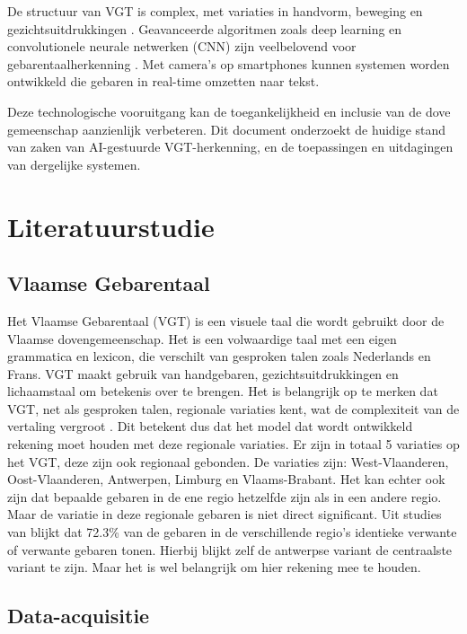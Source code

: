 De structuur van VGT is complex, met variaties in handvorm, beweging en gezichtsuitdrukkingen \autocite{469340}. Geavanceerde algoritmen zoals deep learning en convolutionele neurale netwerken (CNN) zijn veelbelovend voor gebarentaalherkenning \autocite{10.52756/ijerr.2023.v34spl.004}\autocite{10.17485/ijst/v16i45.2583}. Met camera's op smartphones kunnen systemen worden ontwikkeld die gebaren in real-time omzetten naar tekst.

Deze technologische vooruitgang kan de toegankelijkheid en inclusie van de dove gemeenschap aanzienlijk verbeteren. Dit document onderzoekt de huidige stand van zaken van AI-gestuurde VGT-herkenning, en de toepassingen en uitdagingen van dergelijke systemen.
\section{Literatuurstudie}%
\label{sec:literatuurstudie}

\subsection{Vlaamse Gebarentaal}
\label{subsec:vgt}

Het Vlaamse Gebarentaal (VGT) is een visuele taal die wordt gebruikt door de Vlaamse dovengemeenschap. 
Het is een volwaardige taal met een eigen grammatica en lexicon, die verschilt van gesproken talen zoals Nederlands en Frans. 
VGT maakt gebruik van handgebaren, gezichtsuitdrukkingen en lichaamstaal om betekenis over te brengen. 
Het is belangrijk op te merken dat VGT, net als gesproken talen, regionale variaties kent, wat de complexiteit van de vertaling vergroot \autocite{469340}.
Dit betekent dus dat het model dat wordt ontwikkeld rekening moet houden met deze regionale variaties.
Er zijn in totaal 5 variaties op het VGT, deze zijn ook regionaal gebonden\autocite{469340}.
De variaties zijn: West-Vlaanderen, Oost-Vlaanderen, Antwerpen, Limburg en Vlaams-Brabant.
Het kan echter ook zijn dat bepaalde gebaren in de ene regio hetzelfde zijn als in een andere regio.
Maar de variatie in deze regionale gebaren is niet direct significant.
Uit studies van \textcite{469340} blijkt dat 72.3\% van de gebaren in de verschillende regio's identieke verwante of verwante gebaren tonen.
Hierbij blijkt zelf de antwerpse variant de centraalste variant te zijn\autocite{469340}.
Maar het is wel belangrijk om hier rekening mee te houden.


\subsection{Data-acquisitie}
\label{subsec:data-acquisitie}

